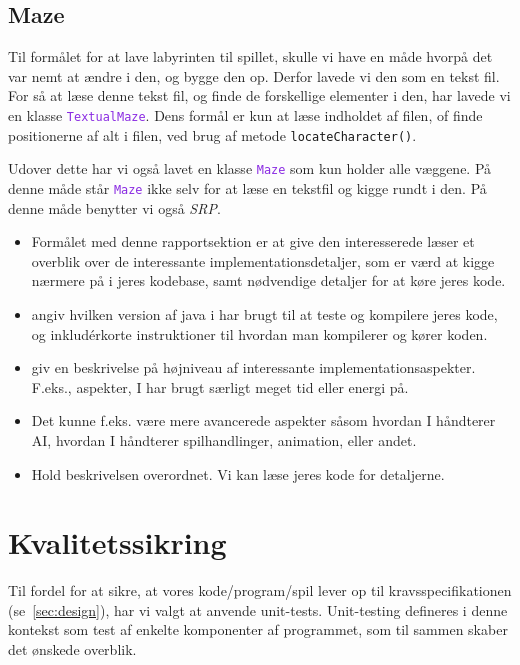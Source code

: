 \documentclass{article}
\newcommand{\code}[1]{\small\texttt{#1}}
\newcommand{\class}[1]{\textcolor{BlueViolet}{\small\texttt{#1}}}
\theoremstyle{mytheoremstyle}
\theoremstyle{mytheoremstyle}
\theoremstyle{myproblemstyle}
\begin{document}
\subsection{Maze}
Til formålet for at lave labyrinten til spillet, skulle vi have en måde hvorpå
det var nemt at ændre i den, og bygge den op. Derfor lavede vi den som en tekst
fil. For så at læse denne tekst fil, og finde de forskellige elementer i den,
har lavede vi en klasse \class{TextualMaze}. Dens formål er kun at læse indholdet
af filen, of finde positionerne af alt i filen, ved brug af metode
\code{locateCharacter()}.

Udover dette har vi også lavet en klasse \class{Maze} som kun holder alle
væggene. På denne måde står \class{Maze} ikke selv for at læse en tekstfil og
kigge rundt i den. På denne måde benytter vi også \textit{SRP}.

\begin{itemize}
  \item Formålet med denne rapportsektion er at give den interesserede læser et
  overblik over de interessante implementationsdetaljer, som er værd at kigge
  nærmere på i jeres kodebase, samt nødvendige detaljer for at køre jeres kode.
  \item angiv hvilken version af java i har brugt til at teste og kompilere
  jeres kode, og inkludérkorte instruktioner til hvordan man kompilerer og kører
  koden.
  \item giv en beskrivelse på højniveau af interessante implementationsaspekter.
  F.eks., aspekter, I har brugt særligt meget tid eller energi på.
  \item Det kunne f.eks. være mere avancerede aspekter såsom hvordan I håndterer
  AI, hvordan I håndterer spilhandlinger, animation, eller andet.
  \item Hold beskrivelsen overordnet. Vi kan læse jeres kode for detaljerne.
\end{itemize}

\newpage
\section{Kvalitetssikring}\label{sec:Kvalitetssikring} %
Til fordel for at sikre, at vores kode/program/spil lever op til
kravsspecifikationen (se \autoref{sec:design}), har vi valgt at anvende
unit-tests. Unit-testing defineres i denne kontekst som test af enkelte
komponenter af programmet, som til sammen skaber det ønskede overblik.
\end{document}
